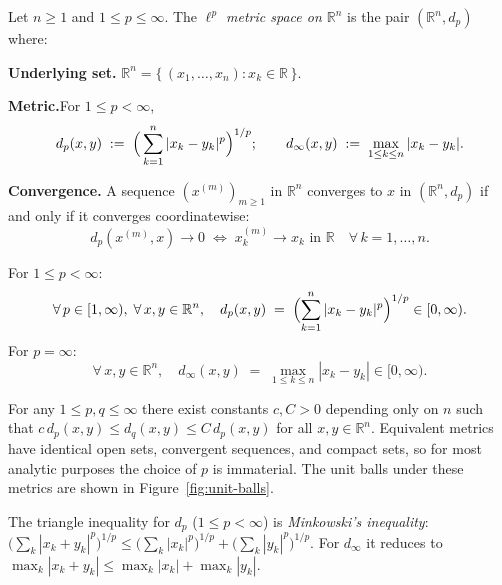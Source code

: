 \begin{tcolorbox}[colback=propbox, colframe=propborder, arc=2pt,
  left=6pt, right=6pt, top=4pt, bottom=4pt,
  title={\small\textbf{Definition ($\ell^p$ Metric Spaces on $\mathbb{R}^n$)}},
  fonttitle=\small\bfseries]
\begin{definition}
\label{def:lp-rn}
Let $n \ge 1$ and $1 \le p \le \infty$.
The \emph{$\ell^p$ metric space on $\mathbb{R}^n$} is the pair
$(\mathbb{R}^n, d_p)$ where:

\medskip
\noindent\textbf{Underlying set.}\quad
$\mathbb{R}^n = \{\,(x_1,\ldots,x_n) : x_k \in \mathbb{R}\,\}$.

\medskip
\noindent\textbf{Metric.}\quad For $1 \le p < \infty$,
\[
d_p(x,y) \;:=\; \Bigl(\,\sum_{k=1}^n |x_k - y_k|^p\Bigr)^{1/p};
\qquad
d_\infty(x,y) \;:=\; \max_{1 \le k \le n}|x_k - y_k|.
\]

\medskip
\noindent\textbf{Convergence.}\quad
A sequence $(x^{(m)})_{m \ge 1}$ in $\mathbb{R}^n$ converges to $x$ in
$(\mathbb{R}^n, d_p)$ if and only if it converges coordinatewise:
\[
d_p(x^{(m)}, x) \to 0
\;\iff\;
x^{(m)}_k \to x_k \text{ in } \mathbb{R}
\quad \forall\, k = 1,\ldots, n.
\]
\end{definition}
\end{tcolorbox}

\begin{remark*}
For $1 \le p < \infty$:
\[
\forall\, p \in [1,\infty),\;
\forall\, x, y \in \mathbb{R}^n, \quad
d_p(x,y) \;=\; \Bigl(\sum_{k=1}^n |x_k - y_k|^p \Bigr)^{1/p} \in [0,\infty).
\]
For $p = \infty$:
\[
\forall\, x, y \in \mathbb{R}^n, \quad
d_\infty(x,y) \;=\; \max_{1 \le k \le n} |x_k - y_k| \in [0,\infty).
\]
\end{remark*}

\begin{remark*}
For any $1 \le p, q \le \infty$ there exist constants $c, C > 0$
depending only on $n$ such that
$c\,d_p(x,y) \le d_q(x,y) \le C\,d_p(x,y)$ for all $x, y \in \mathbb{R}^n$.
Equivalent metrics have identical open sets, convergent sequences, and
compact sets, so for most analytic purposes the choice of $p$ is immaterial.
The unit balls under these metrics are shown in Figure~\ref{fig:unit-balls}.
\end{remark*}

\begin{remark*}
The triangle inequality for $d_p$ ($1 \le p < \infty$) is
\emph{Minkowski's inequality}:
$\bigl(\sum_{k}|x_k+y_k|^p\bigr)^{1/p}
\le \bigl(\sum_k|x_k|^p\bigr)^{1/p} + \bigl(\sum_k|y_k|^p\bigr)^{1/p}$.
For $d_\infty$ it reduces to $\max_k|x_k+y_k|\le\max_k|x_k|+\max_k|y_k|$.
\end{remark*}

